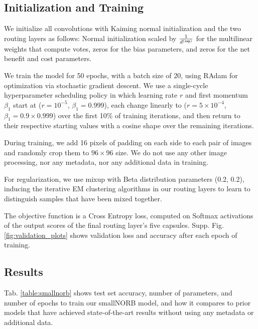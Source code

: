 \documentclass[11pt,a4paper]{article}
\begin{document}
\subsection{Initialization and Training}

We initialize all convolutions with Kaiming normal initialization \cite{DBLP:journals/corr/HeZR015} and the two routing layers as follows: Normal initialization scaled by $1 \over d^{{\scriptscriptstyle\tt (inp)}}$ for the multilinear weights that compute votes, zeros for the bias parameters, and zeros for the net benefit and cost parameters.

We train the model for 50 epochs, with a batch size of 20, using RAdam \cite{liu2019variance} for optimization via stochastic gradient descent. We use a single-cycle hyperparameter scheduling policy in which learning rate $r$ and first momentum $\beta_1$ start at ($r=10^{-5}$, $\beta_1=0.999$), each change linearly to ($r=5 \times 10^{-4}$, $\beta_1=0.9 \times 0.999$) over the first 10\% of training iterations, and then return to their respective starting values with a cosine shape over the remaining iterations.

During training, we add 16 pixels of padding on each side to each pair of images and randomly crop them to $96 \times 96$ size. We do not use any other image processing, nor any metadata, nor any additional data in training.

For regularization, we use mixup \cite{DBLP:journals/corr/abs-1710-09412} with Beta distribution parameters (0.2, 0.2), inducing the iterative EM clustering algorithms in our routing layers to learn to distinguish samples that have been mixed together.

The objective function is a Cross Entropy loss, computed on Softmax activations of the output scores of the final routing layer's five capsules. Supp. Fig. \ref{fig:validation_plots} shows validation loss and accuracy after each epoch of training.

\subsection{Results}

Tab. \ref{table:smallnorb} shows test set accuracy, number of parameters, and number of epochs to train our smallNORB model, and how it compares to prior models that have achieved state-of-the-art results without using any metadata or additional data.
\end{document}
